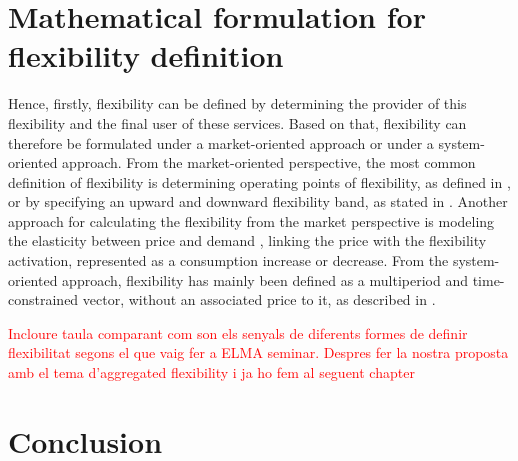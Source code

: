 \section{Mathematical formulation for flexibility definition}
Hence, firstly, flexibility can be defined by determining the provider of this flexibility and the final user of these services. Based on that, flexibility can therefore be formulated under a market-oriented approach or under a system-oriented approach. From the market-oriented perspective, the most common definition of flexibility is determining operating points of flexibility, as defined in \cite{Olivella-Rosell2018}, or by specifying an upward and downward flexibility band, as stated in \cite{Soares2017}. Another approach for calculating the flexibility from the market perspective is modeling the elasticity between price and demand \cite{Gorria2013}, linking the price with the flexibility activation, represented as a consumption increase or decrease. From the system-oriented approach, flexibility has mainly been defined as a multiperiod and time-constrained vector, without an associated price to it, as described in \cite{Pinto2017}. 

\textcolor{red}{Incloure taula comparant com son els senyals de diferents formes de definir flexibilitat segons el que vaig fer a ELMA seminar. Despres fer la nostra proposta amb el tema d'aggregated flexibility i ja ho fem al seguent chapter }

\section{Conclusion}

	



